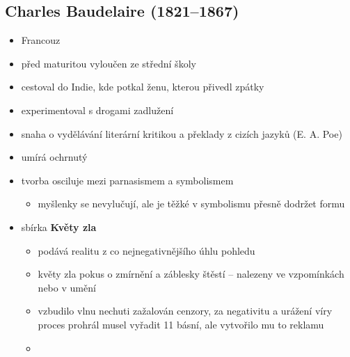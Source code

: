 \subsection{Charles Baudelaire (1821--1867)}
\begin{itemize}
\item Francouz
\item před maturitou vyloučen ze střední školy
\item cestoval do Indie, kde potkal ženu, kterou přivedl zpátky
\item experimentoval s drogami \ra zadlužení
\item snaha o vydělávání literární kritikou a překlady z cizích jazyků (E. A. Poe)
\item umírá ochrnutý
\item tvorba osciluje mezi parnasismem a symbolismem
	\begin{itemize}
	\item myšlenky se nevylučují, ale je těžké v symbolismu přesně dodržet formu
	\end{itemize}
\item sbírka \textbf{Květy zla}
	\begin{itemize}
	\item podává realitu z co nejnegativnějšího úhlu pohledu
	\item květy zla \ra pokus o zmírnění a záblesky štěstí -- nalezeny ve vzpomínkách nebo v umění
	\item vzbudilo vlnu nechuti \ra zažalován cenzory, za negativitu a urážení víry \ra proces prohrál \ra musel vyřadit 11 básní, ale vytvořilo mu to reklamu
	\item 
	\end{itemize}
\end{itemize}


